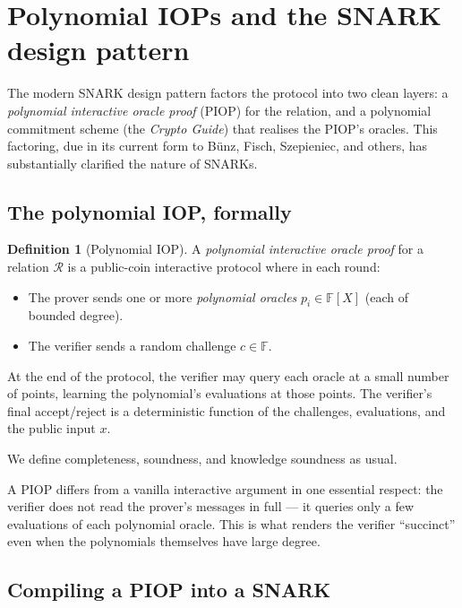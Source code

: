 \documentclass[11pt,a4paper]{article}
\theoremstyle{definition}
\newtheorem{definition}[theorem]{Definition}
\newcommand{\F}{\mathbb{F}}
\newcommand{\Rel}{\mathcal{R}}
\begin{document}
\section{Polynomial IOPs and the SNARK design pattern}\label{sec:piop}

The modern SNARK design pattern factors the protocol into two clean
layers: a \emph{polynomial interactive oracle proof} (PIOP) for the
relation, and a polynomial commitment scheme (the \emph{Crypto Guide}) that
realises the PIOP's oracles. This factoring, due in its current form to
Bünz, Fisch, Szepieniec, and others, has substantially clarified the
nature of SNARKs.

\subsection{The polynomial IOP, formally}

\begin{definition}[Polynomial IOP]\label{def:piop}
A \emph{polynomial interactive oracle proof} for a relation $\Rel$ is a
public-coin interactive protocol where in each round:
\begin{itemize}[leftmargin=*]
\item The prover sends one or more \emph{polynomial oracles} $p_i \in \F[X]$
(each of bounded degree).
\item The verifier sends a random challenge $c \in \F$.
\end{itemize}
At the end of the protocol, the verifier may query each oracle at a small
number of points, learning the polynomial's evaluations at those points.
The verifier's final accept/reject is a deterministic function of the
challenges, evaluations, and the public input $x$.

We define completeness, soundness, and knowledge soundness as usual.
\end{definition}

A PIOP differs from a vanilla interactive argument in one essential respect:
the verifier does not read the prover's messages in full --- it queries
only a few evaluations of each polynomial oracle. This is what renders the
verifier ``succinct'' even when the polynomials themselves have large degree.

\subsection{Compiling a PIOP into a SNARK}
\end{document}
